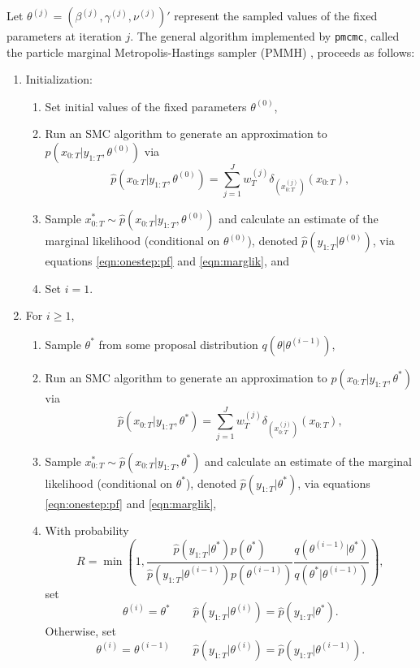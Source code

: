 Let $\theta^{(j)} = \left(\beta^{(j)},\gamma^{(j)},\nu^{(j)}\right)'$ represent the sampled values of the fixed parameters at iteration $j$. The general algorithm implemented by {\tt pmcmc}, called the particle marginal Metropolis-Hastings sampler (PMMH) \cite[Section 2.4.2][]{Andr:Douc:Hol:pmcmc:2010}, proceeds as follows:
\begin{enumerate}
\item Initialization:
\begin{enumerate}
\item Set initial values of the fixed parameters $\theta^{(0)}$,
\item Run an SMC algorithm to generate an approximation to $p(x_{0:T}|y_{1:T},\theta^{(0)})$ via
    \[\hat{p}\left(x_{0:T}|y_{1:T},\theta^{(0)}\right) = \sum_{j=1}^J w_T^{(j)} \delta_{\left(x_{0:T}^{(j)}\right)}(x_{0:T}),\]
\item Sample $x_{0:T}^* \sim \hat{p}\left(x_{0:T}|y_{1:T},\theta^{(0)}\right)$ and calculate an estimate of the marginal likelihood (conditional on $\theta^{(0)}$), denoted $\hat{p}\left(y_{1:T}|\theta^{(0)}\right)$, via equations \eqref{eqn:onestep:pf} and \eqref{eqn:marglik}, and
\item Set $i = 1$.
\end{enumerate}
\item For $i \ge 1$,
\begin{enumerate}
\item Sample $\theta^*$ from some proposal distribution $q(\theta|\theta^{(i-1)})$,
\item Run an SMC algorithm to generate an approximation to $p(x_{0:T}|y_{1:T},\theta^*)$ via
    \[\hat{p}(x_{0:T}|y_{1:T},\theta^*) = \sum_{j=1}^J w_T^{(j)} \delta_{\left(x_{0:T}^{(j)}\right)}(x_{0:T}),\]
\item Sample $x_{0:T}^* \sim \hat{p}(x_{0:T}|y_{1:T},\theta^*)$ and calculate an estimate of the marginal likelihood (conditional on $\theta^*$), denoted $\hat{p}(y_{1:T}|\theta^*)$, via equations \eqref{eqn:onestep:pf} and \eqref{eqn:marglik},
\item With probability
    \[R = \min\left(1, \frac{\hat{p}(y_{1:T}|\theta^*)p(\theta^*)}{\hat{p}\left(y_{1:T}|\theta^{(i-1)}\right)p\left(\theta^{(i-1)}\right)} \frac{q\left(\theta^{(i-1)}|\theta^*\right)}{q\left(\theta^*|\theta^{(i-1)}\right)} \right),\]
    set
    \[\theta^{(i)} = \theta^* \qquad \hat{p}\left(y_{1:T}|\theta^{(i)}\right) = \hat{p}(y_{1:T}|\theta^*).\]
    Otherwise, set
    \[\theta^{(i)} = \theta^{(i-1)} \qquad \hat{p}\left(y_{1:T}|\theta^{(i)}\right) = \hat{p}\left(y_{1:T}|\theta^{(i-1)}\right).\]
\end{enumerate}
\end{enumerate}

